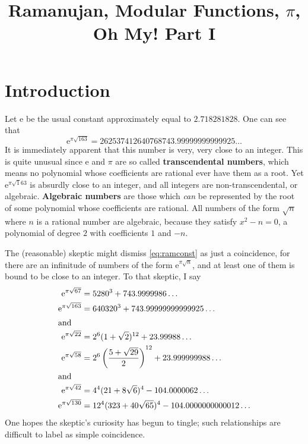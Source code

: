 \documentclass{microdoc}
\title{Ramanujan, Modular Functions, $\pi$, Oh My! Part I}%
\author{\authb{Robert Smith}{quadricode@gmail.com}}%
\newcommand{\ee}{\ensuremath{\mathrm{e}}}
\newcommand{\defn}[1]{\textbf{#1}}
\begin{document}
\maketitle

\section{Introduction}
Let $\ee$ be the usual constant approximately equal to
$2.718281828$. One can see that
\begin{equation}
  \label{eq:ramconst}%
  \ee^{\pi\sqrt{163}} = 262537412640768743.99999999999925\ldots
\end{equation}
It is immediately apparent that this number is very, very close to an
integer. This is quite unusual since $\ee$ and $\pi$ are so called
\defn{transcendental numbers}, which means no polynomial whose
coefficients are rational ever have them as a root. Yet $\ee^{\pi\surd
  163}$ is absurdly close to an integer, and all integers are
non-transcendental, or algebraic. \defn{Algebraic numbers} are those
which \emph{can} be represented by the root of some polynomial whose
coefficients are rational. All numbers of the form $\sqrt{n}$ where
$n$ is a rational number are algebraic, because they satisfy $x^2 - n
= 0$, a polynomial of degree $2$ with coefficients $1$ and $-n$.

The (reasonable) skeptic might dismiss \eqref{eq:ramconst} as just a
coincidence, for there are an infinitude of numbers of the form
$\ee^{\pi\surd n}$, and at least one of them is bound to be close to
an integer. To that skeptic, I say
\begin{align}
  \ee^{\pi\sqrt{67}}  &= 5280^3 + 743.9999986\ldots\label{eq:hilbert1}\\
  \ee^{\pi\sqrt{163}} &= 640320^3 + 743.99999999999925\ldots\label{eq:hilbert2}\\
  \intertext{and}
  \ee^{\pi\sqrt{22}} &= 2^6 (1+\sqrt{2})^{12} + 23.99988\ldots\label{eq:weber1}\\
  \ee^{\pi\sqrt{58}} &= 2^6 \left(\frac{5+\sqrt{29}}{2}\right)^{12} + 23.999999988\ldots\label{eq:weber2}\\
  \intertext{and}
  \ee^{\pi\sqrt{42}}  &= 4^4 (21 + 8\sqrt{6})^4 - 104.0000062\ldots\label{eq:raman1}\\
  \ee^{\pi\sqrt{130}} &= 12^4 (323 + 40\sqrt{65})^4 - 104.0000000000012\ldots\label{eq:raman2}
\end{align}
One hopes the skeptic's curiosity has begun to tingle; such
relationships are difficult to label as simple coincidence.
\end{document}
